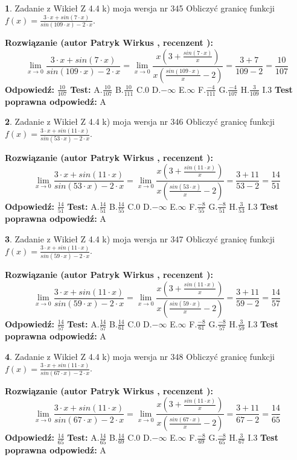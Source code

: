\documentclass[12pt, a4paper]{article}
\theoremstyle{definition} %
\newtheorem{zad}{}
\newcommand{\zadStart}[1]{\begin{zad}#1\newline}
\newcommand{\zadStop}{\end{zad}}
\newcommand{\rozwStart}[2]{\noindent \textbf{Rozwiązanie (autor #1 , recenzent #2): }\newline}
\newcommand{\rozwStop}{\newline}
\newcommand{\odpStart}{\noindent \textbf{Odpowiedź:}\newline}
\newcommand{\odpStop}{\newline}
\newcommand{\testStart}{\noindent \textbf{Test:}\newline}
\newcommand{\testStop}{\newline}
\newcommand{\kluczStart}{\noindent \textbf{Test poprawna odpowiedź:}\newline}
\newcommand{\kluczStop}{\newline}
\begin{document}
\zadStart{Zadanie z Wikieł Z 4.4 k) moja wersja nr 345}
Obliczyć granicę funkcji $f(x)=\frac{3\cdot x +sin(7\cdot x)}{sin(109\cdot x) -2\cdot x}$.
\zadStop
\rozwStart{Patryk Wirkus}{}
$$\lim\limits_{x\to 0}\frac{3\cdot x +sin(7\cdot x)}{sin(109\cdot x) -2\cdot x}
=\lim\limits_{x\to 0}\frac{x(3+\frac{sin(7\cdot x)}{x})}{x(\frac{sin(109\cdot x)}{x}-2)}
=\frac{3+7}{109-2} = \frac{10}{107}$$
\rozwStop
\odpStart
$\frac{10}{107}$
\odpStop
\testStart
A.$\frac{10}{107}$
B.$\frac{10}{111}$
C.$0$
D.$-\infty$
E.$\infty$
F.$\frac{-4}{111}$
G.$\frac{-4}{107}$
H.$\frac{3}{109}$
I.$3$
\testStop
\kluczStart
A
\kluczStop



\zadStart{Zadanie z Wikieł Z 4.4 k) moja wersja nr 346}
Obliczyć granicę funkcji $f(x)=\frac{3\cdot x +sin(11\cdot x)}{sin(53\cdot x) -2\cdot x}$.
\zadStop
\rozwStart{Patryk Wirkus}{}
$$\lim\limits_{x\to 0}\frac{3\cdot x +sin(11\cdot x)}{sin(53\cdot x) -2\cdot x}
=\lim\limits_{x\to 0}\frac{x(3+\frac{sin(11\cdot x)}{x})}{x(\frac{sin(53\cdot x)}{x}-2)}
=\frac{3+11}{53-2} = \frac{14}{51}$$
\rozwStop
\odpStart
$\frac{14}{51}$
\odpStop
\testStart
A.$\frac{14}{51}$
B.$\frac{14}{55}$
C.$0$
D.$-\infty$
E.$\infty$
F.$\frac{-8}{55}$
G.$\frac{-8}{51}$
H.$\frac{3}{53}$
I.$3$
\testStop
\kluczStart
A
\kluczStop



\zadStart{Zadanie z Wikieł Z 4.4 k) moja wersja nr 347}
Obliczyć granicę funkcji $f(x)=\frac{3\cdot x +sin(11\cdot x)}{sin(59\cdot x) -2\cdot x}$.
\zadStop
\rozwStart{Patryk Wirkus}{}
$$\lim\limits_{x\to 0}\frac{3\cdot x +sin(11\cdot x)}{sin(59\cdot x) -2\cdot x}
=\lim\limits_{x\to 0}\frac{x(3+\frac{sin(11\cdot x)}{x})}{x(\frac{sin(59\cdot x)}{x}-2)}
=\frac{3+11}{59-2} = \frac{14}{57}$$
\rozwStop
\odpStart
$\frac{14}{57}$
\odpStop
\testStart
A.$\frac{14}{57}$
B.$\frac{14}{61}$
C.$0$
D.$-\infty$
E.$\infty$
F.$\frac{-8}{61}$
G.$\frac{-8}{57}$
H.$\frac{3}{59}$
I.$3$
\testStop
\kluczStart
A
\kluczStop



\zadStart{Zadanie z Wikieł Z 4.4 k) moja wersja nr 348}
Obliczyć granicę funkcji $f(x)=\frac{3\cdot x +sin(11\cdot x)}{sin(67\cdot x) -2\cdot x}$.
\zadStop
\rozwStart{Patryk Wirkus}{}
$$\lim\limits_{x\to 0}\frac{3\cdot x +sin(11\cdot x)}{sin(67\cdot x) -2\cdot x}
=\lim\limits_{x\to 0}\frac{x(3+\frac{sin(11\cdot x)}{x})}{x(\frac{sin(67\cdot x)}{x}-2)}
=\frac{3+11}{67-2} = \frac{14}{65}$$
\rozwStop
\odpStart
$\frac{14}{65}$
\odpStop
\testStart
A.$\frac{14}{65}$
B.$\frac{14}{69}$
C.$0$
D.$-\infty$
E.$\infty$
F.$\frac{-8}{69}$
G.$\frac{-8}{65}$
H.$\frac{3}{67}$
I.$3$
\testStop
\kluczStart
A
\kluczStop
\end{document}
